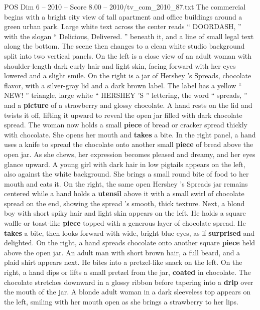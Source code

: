 \begin{textsample}{POS Dim 6 – 2010 – Score 8.00 – 2010/tv\_com\_2010\_87.txt}  \label{ex:f6_pos_084}
The commercial begins with a bright city view of tall apartment and office buildings around a green urban park.
Large white text across the center reads “ DOORDASH, ” with the slogan “ Delicious, Delivered. ” beneath it, and a line of small legal text along the bottom.
The scene then changes to a clean white studio background split into two vertical panels.
On the left is a close view of an adult woman with shoulder-length dark curly hair and light skin, facing forward with her eyes lowered and a slight smile.
On the right is a jar of Hershey ’s Spreads, chocolate flavor, with a silver-gray lid and a dark brown label.
The label has a yellow “ NEW! ” triangle, large white “ HERSHEY ’S ” lettering, the word “ spreads, ” and a \textbf{picture} of a strawberry and glossy chocolate.
A hand rests on the lid and twists it off, lifting it upward to reveal the open jar filled with dark chocolate spread.
The woman now holds a small \textbf{piece} of bread or cracker spread thickly with chocolate.
She opens her mouth and \textbf{takes} a bite.
In the right panel, a hand uses a knife to spread the chocolate onto another small \textbf{piece} of bread above the open jar.
As she chews, her expression becomes pleased and dreamy, and her eyes glance upward.
A young girl with dark hair in low pigtails appears on the left, also against the white background.
She brings a small round bite of food to her mouth and eats it.
On the right, the same open Hershey ’s Spreads jar remains centered while a hand holds a \textbf{utensil} above it with a small swirl of chocolate spread on the end, showing the spread ’s smooth, thick texture.
Next, a blond boy with short spiky hair and light skin appears on the left.
He holds a square waffle or toast-like \textbf{piece} topped with a generous layer of chocolate spread.
He \textbf{takes} a bite, then looks forward with wide, bright blue eyes, as if \textbf{surprised} and delighted.
On the right, a hand spreads chocolate onto another square \textbf{piece} held above the open jar.
An adult man with short brown hair, a full beard, and a plaid shirt appears next.
He bites into a pretzel-like snack on the left.
On the right, a hand dips or lifts a small pretzel from the jar, \textbf{coated} in chocolate.
The chocolate stretches downward in a glossy ribbon before tapering into a \textbf{drip} over the mouth of the jar.
A blonde adult woman in a dark sleeveless top appears on the left, smiling with her mouth open as she brings a strawberry to her lips.

\end{textsample}
